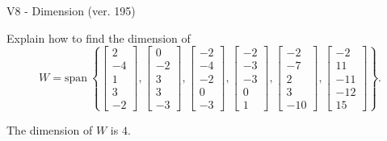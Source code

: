 \begin{exercise}
  \begin{exerciseTitle}V8 - Dimension (ver. 195)\end{exerciseTitle}
  \begin{exerciseStatement}
    Explain how to find the dimension of 
\[W=\mathrm{span}\ \left\{\left[\begin{array}{r}
2 \\
-4 \\
1 \\
3 \\
-2
\end{array}\right] , \left[\begin{array}{r}
0 \\
-2 \\
3 \\
3 \\
-3
\end{array}\right] , \left[\begin{array}{r}
-2 \\
-4 \\
-2 \\
0 \\
-3
\end{array}\right] , \left[\begin{array}{r}
-2 \\
-3 \\
-3 \\
0 \\
1
\end{array}\right] , \left[\begin{array}{r}
-2 \\
-7 \\
2 \\
3 \\
-10
\end{array}\right] , \left[\begin{array}{r}
-2 \\
11 \\
-11 \\
-12 \\
15
\end{array}\right]\right\}.\]



  \end{exerciseStatement}
  \begin{exerciseAnswer}
   The dimension of \(W\) is  \(4\).
  


  \end{exerciseAnswer}
\end{exercise}